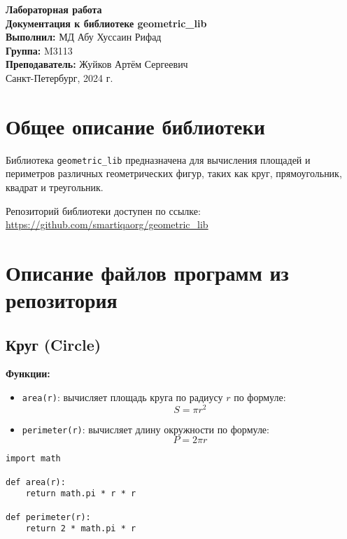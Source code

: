\documentclass[a4paper,12pt]{article}
\begin{document}
\begin{titlepage}
    \centering
    {\large \textbf{Лабораторная работа}}\\[1cm]
    {\Large \textbf{Документация к библиотеке geometric\_lib}}\\[2cm]
    \textbf{Выполнил:} МД Абу Хуссаин Рифад \\[0.5cm]
    \textbf{Группа:} M3113 \\[0.5cm]
    \textbf{Преподаватель:} Жуйков Артём Сергеевич \\[2cm]
    \vfill
    Санкт-Петербург, 2024 г.
\end{titlepage}

\tableofcontents
\newpage

\section{Общее описание библиотеки}
Библиотека \texttt{geometric\_lib} предназначена для вычисления площадей и периметров различных геометрических фигур, таких как круг, прямоугольник, квадрат и треугольник. 

Репозиторий библиотеки доступен по ссылке:  
\url{https://github.com/smartiqaorg/geometric_lib}

\newpage

\section{Описание файлов программ из репозитория}

\subsection*{Круг (Circle)}
\textbf{Функции:}
\begin{itemize}
    \item \texttt{area(r)}: вычисляет площадь круга по радиусу \( r \) по формуле:  
    \[
    S = \pi r^2
    \]
    \item \texttt{perimeter(r)}: вычисляет длину окружности по формуле:  
    \[
    P = 2 \pi r
    \]
\end{itemize}

\begin{lstlisting}[caption={Код для вычисления площади и периметра круга}]
import math

def area(r):
    return math.pi * r * r

def perimeter(r):
    return 2 * math.pi * r
\end{lstlisting}
\end{document}

